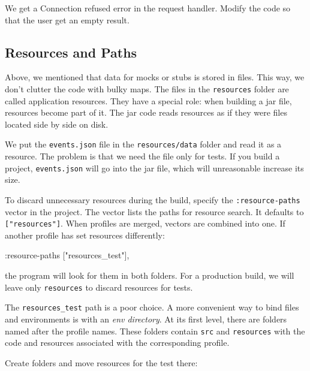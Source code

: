 We get a Connection refused error in the request handler. Modify the code so that the user get an empty result.

\subsection{Resources and Paths}

\label{resources}


Above, we mentioned that data for mocks or stubs is stored in files. This way, we don't clutter the code with bulky maps. The files in the \verb|resources| folder are called application resources. They have a special role: when building a jar file, resources become part of it. The jar code reads resources as if they were files located side by side on disk.

We put the \verb|events.json| file in the \verb|resources/data| folder and read it as a resource. The problem is that we need the file only for tests. If you build a project, \verb|events.json| will go into the jar file, which will unreasonable increase its size.

To discard unnecessary resources during the build, specify the \verb|:resource-paths| vector in the project. The vector lists the paths for resource search. It defaults to \verb|["resources"]|. When profiles are merged, vectors are combined into one. If another profile has set resources differently:

\begin{english}
  \begin{clojure}
:resource-paths ["resources_test"],
  \end{clojure}
\end{english}

\noindent
the program will look for them in both folders. For a production build, we will leave only \verb|resources| to discard resources for tests.


The \verb|resources_test| path is a poor choice. A more convenient way to bind files and environments is with an \emph{env directory}. At its first level, there are folders named after the profile names. These folders contain \verb|src| and \verb|resources| with the code and resources associated with the corresponding profile.

Create folders and move resources for the test there:

